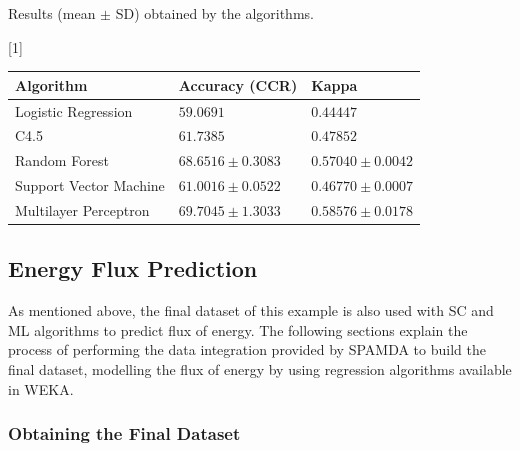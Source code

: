 \documentclass[energies,article,accept,moreauthors,pdftex]{Definitions/mdpi}
\begin{document}
\begin{paracol}{2}
\switchcolumn
   \begin{specialtable}[H]
				
					\caption{Results (mean $\pm$ SD) obtained by the algorithms.}
					\label{tab:results}
					\setlength{\cellWidtha}{\columnwidth/3-2\tabcolsep+0.0in}
\setlength{\cellWidthb}{\columnwidth/3-2\tabcolsep+0.0in}
\setlength{\cellWidthc}{\columnwidth/3-2\tabcolsep+0.0in}
\scalebox{1}[1]{\begin{tabularx}{\columnwidth}{>{\PreserveBackslash\centering}m{\cellWidtha}>{\PreserveBackslash\centering}m{\cellWidthb}>{\PreserveBackslash\centering}m{\cellWidthc}}
\toprule
						
						\textbf{Algorithm}&\textbf{Accuracy (CCR)}&\textbf{Kappa}\\
	
						\midrule
						
						Logistic Regression & $59.0691$ & $0.44447$\\ 		\midrule
						
						C4.5 & $61.7385$ & $0.47852$\\ 		\midrule
						
						Random Forest & $68.6516 \pm 0.3083$ & $0.57040 \pm 0.0042$\\ 		\midrule
						
						Support Vector Machine & $61.0016 \pm 0.0522$ & $0.46770 \pm 0.0007$\\ 		\midrule
						
						Multilayer Perceptron & $69.7045 \pm 1.3033$  & $0.58576 \pm 0.0178$\\ 	

						\bottomrule
							
					\end{tabularx}}
				
				\end{specialtable}			
			\subsection{Energy Flux Prediction}
			
			As mentioned above, the final dataset of this example is also used with SC and ML algorithms to predict flux of energy. The following sections explain the process of performing the data integration provided by SPAMDA to build the final dataset, modelling the flux of energy by using regression algorithms available in WEKA.
			
			\subsubsection{Obtaining the Final Dataset}
			

\end{paracol}
\end{document}
